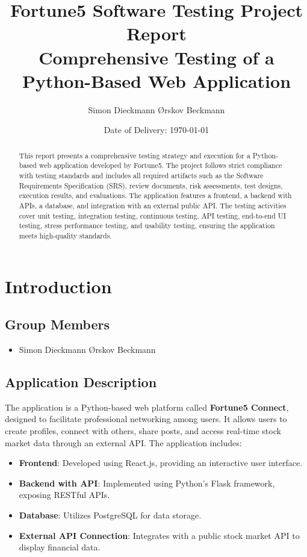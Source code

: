 \documentclass[12pt,a4paper]{report}
\title{
    \bfseries Fortune5 Software Testing Project Report\\
    \vspace{0.5cm}
    \large Comprehensive Testing of a Python-Based Web Application
}
\author{
    \begin{tabular}{c}
        Simon Dieckmann Ørskov Beckmann \\
    \end{tabular}
}
\date{Date of Delivery: \today}
\begin{document}
\maketitle
\thispagestyle{empty}
\newpage

\tableofcontents
\listoffigures
\listoftables
\newpage

\begin{abstract}
This report presents a comprehensive testing strategy and execution for a Python-based web application developed by Fortune5. The project follows strict compliance with testing standards and includes all required artifacts such as the Software Requirements Specification (SRS), review documents, risk assessments, test designs, execution results, and evaluations. The application features a frontend, a backend with APIs, a database, and integration with an external public API. The testing activities cover unit testing, integration testing, continuous testing, API testing, end-to-end UI testing, stress performance testing, and usability testing, ensuring the application meets high-quality standards.
\end{abstract}
\newpage

\chapter{Introduction}
\section{Group Members}
\begin{itemize}
    \item Simon Dieckmann Ørskov Beckmann
\end{itemize}

\section{Application Description}
The application is a Python-based web platform called \textbf{Fortune5 Connect}, designed to facilitate professional networking among users. It allows users to create profiles, connect with others, share posts, and access real-time stock market data through an external API. The application includes:

\begin{itemize}
    \item \textbf{Frontend}: Developed using React.js, providing an interactive user interface.
    \item \textbf{Backend with API}: Implemented using Python's Flask framework, exposing RESTful APIs.
    \item \textbf{Database}: Utilizes PostgreSQL for data storage.
    \item \textbf{External API Connection}: Integrates with a public stock market API to display financial data.
\end{itemize}
\end{document}
